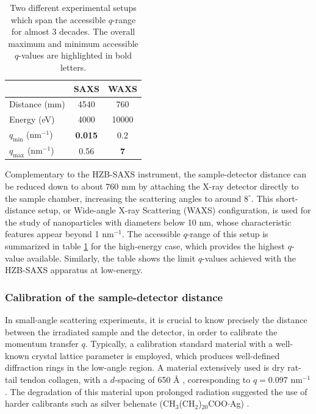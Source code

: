 \begin{table}[]
\centering
\caption[Two different SAXS experimental setups and their accessible $q$-range.]{Two different experimental setups which span the accessible $q$-range for almost 3 decades. The overall maximum and minimum accessible $q$-values are highlighted in bold letters.}
\label{tab:qrange}
\begin{tabular}{|l|c|c|}
\hline
              & \textbf{SAXS} & \textbf{WAXS} \\ \hline
Distance (mm) & 4540          & 760           \\ \hline
Energy (eV)   & 4000          & 10000         \\ \hline
$q_{\text{min}}$ (nm$^{-1}$)   & \textbf{0.015}         & 0.2          \\ \hline
$q_{\text{max}}$ (nm$^{-1}$)   & 0.56             & \textbf{7}             \\ \hline
\end{tabular}
\end{table}

Complementary to the HZB-SAXS instrument, the sample-detector distance can be reduced down to about 760 mm by attaching the X-ray detector directly to the sample chamber, increasing the scattering angles to around $8^{\circ}$. This short-distance setup, or Wide-angle X-ray Scattering (WAXS) configuration, is used for the study of nanoparticles with diameters below 10 nm, whose characteristic features appear beyond 1 nm$^{-1}$. The accessible $q$-range of this setup is summarized in table \ref{tab:qrange} for the high-energy case, which provides the highest $q$-value available. Similarly, the table shows the limit $q$-values achieved with the HZB-SAXS apparatus at low-energy.

\subsubsection{Calibration of the sample-detector distance}

In small-angle scattering experiments, it is crucial to know precisely the distance between the irradiated sample and the detector, in order to calibrate the momentum transfer $q$. Typically, a calibration standard material with a well-known crystal lattice parameter is employed, which produces well-defined diffraction rings in the low-angle region. A material extensively used is dry rat-tail tendon collagen, with a $d$-spacing of 650 {\AA} \citep{amenitsch_performance_1997}, corresponding to $q=0.097$ nm$^{-1}$. The degradation of this material upon prolonged radiation suggested the use of harder calibrants such as silver behenate (CH$_3$(CH$_2$)$_{20}$COO$\cdot$Ag) \citep{huang_x-ray_1993}.

